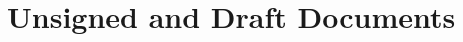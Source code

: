 \documentclass{article}\usepackage[]{graphicx}\usepackage[]{color}
\newenvironment{absolutelynopagebreak}
  {\par\nobreak\vfil\penalty0\vfilneg
   \vtop\bgroup}
  {\par\xdef\tpd{\the\prevdepth}\egroup
   \prevdepth=\tpd}
\begin{document}


\pagebreak
\section{Unsigned and Draft Documents}
\end{document}
